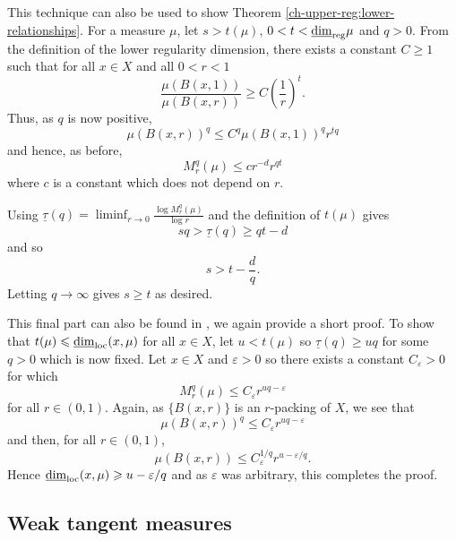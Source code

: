 This technique can also be used to show Theorem \ref{ch-upper-reg:lower-relationships}. For a measure $\mu$, let $s > t(\mu)$, $0 < t < \underline{\dim}_{\textup{reg}} \mu$ and $q > 0$. From the definition of the lower regularity dimension, there exists a constant $C \ge 1$ such that for all $x\in X$ and all $0<r<1$
\[
\frac{\mu(B(x,1))}{\mu(B(x,r))} \ge C \left( \frac{1}{r}\right)^t.
\]
Thus, as $q$ is now positive,
\[
\mu(B(x,r))^q \le C^q \mu(B(x,1))^q r^{tq}
\]
and hence, as before,
\[
M_r^q(\mu) \le cr^{-d}r^{qt}
\]
where $c$ is a constant which does not depend on $r$.

Using $\underline{\tau}(q) = \liminf_{r \rightarrow 0} \frac{\log M_r^q(\mu)}{\log r}$ and the definition of $t(\mu)$ gives
\[
sq > \underline{\tau}(q) \ge qt - d
\]
and so
\[
s> t-\frac{d}{q}.
\]
Letting $q \rightarrow \infty$ gives $s \ge t$ as desired.

This final part can also be found in \cite[Lemma 4.4]{olsenformalism}, we again provide a short proof. To show that $t(\mu) \leqslant \underline{\dim}_{\textup{loc}}(x,\mu)$ for all $x \in X$, let $u < t(\mu)$ so $\underline{\tau}(q) \ge uq$ for some $q > 0$ which is now fixed. Let $ x \in X$ and $\varepsilon > 0$ so there exists a constant $C_{\varepsilon} > 0$ for which
\[
M_r^q(\mu) \le C_\varepsilon r^{uq - \varepsilon}
\]
for all $r \in (0,1)$. Again, as $\{B(x,r) \}$ is an $r$-packing of $X$, we see that
\[
\mu(B(x,r))^q \le C_\varepsilon r^{uq - \varepsilon}
\]
and then, for all $r \in (0,1)$,
\[
\mu(B(x,r)) \le C_\varepsilon^{1/q} r^{u-\varepsilon/q}.
\]
Hence $\underline{\dim}_{\textup{loc}}(x,\mu) \geqslant u -\varepsilon / q$ and as $\varepsilon$ was arbitrary, this completes the proof.




\subsection{Weak tangent measures} \label{ch-upper-reg:weaktangentsproof}

